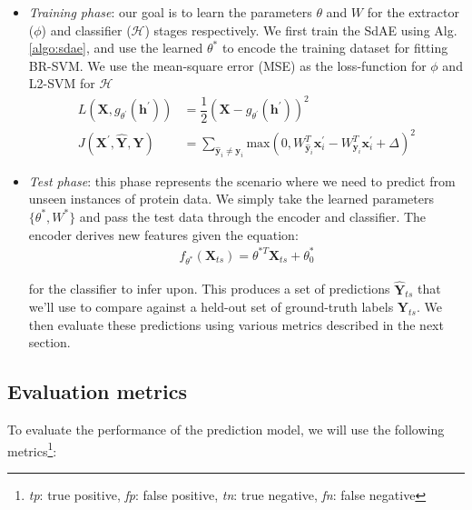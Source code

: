 \begin{itemize}
  \item \textit{Training phase}: our goal is to learn the parameters $\theta$
  and $W$ for the extractor ($\phi$) and classifier ($\mathcal{H}$) stages
  respectively. We first train the SdAE using Alg. \ref{algo:sdae}, and use
  the learned $\theta^{\ast}$ to encode the training dataset for fitting
  BR-SVM. We use the mean-square error (MSE) as the loss-function for $\phi$ and
  L2-SVM for $\mathcal{H}$
  \begin{align}
    \label{eqn:loss_fe_sdae}
    L(\mathbf{X},g_{\theta^{\prime}}(\mathbf{h}^{\prime})) &=
      \dfrac{1}{2}(\mathbf{X} - g_{\theta^{\prime}}(\mathbf{h}^{\prime}))^{2}\\
    \label{eqn:loss_clf_sdae}
    J(\mathbf{X}^{\prime}, \widehat{\mathbf{Y}}, \mathbf{Y}) &= \sum_{\widehat{\mathbf{y}}_i \neq \mathbf{y}_{i}} \text{max}(0, W^{T}_{\widehat{\mathbf{y}}_{i}} \mathbf{x}_{i}^{\prime} - W^{T}_{\mathbf{y}_i}\mathbf{x}^{\prime}_i + \Delta)^2
  \end{align}
  \item \textit{Test phase}: this phase represents the scenario where we need
  to predict from unseen instances of protein data. We simply take the
  learned parameters $\{\theta^{\ast}, W^{\ast}\}$ and pass the test data
  through the encoder and classifier. The encoder derives new features given the
  equation: 
  \begin{align}
    \label{eqn:encoder_mc_sdae}
    f_{\theta^{\ast}}(\mathbf{X}_{ts}) = \theta^{\ast T} \mathbf{X}_{ts} + \theta_{0}^{\ast}
  \end{align}
  
  \noindent for the classifier to infer upon. This produces a set of
  predictions $\mathbf{\widehat{Y}}_{ts}$ that we'll use to compare against a
  held-out set of ground-truth labels $\mathbf{Y}_{ts}$. We then evaluate
  these predictions using various metrics described in the next section.
\end{itemize}

\newpage
\subsection{Evaluation metrics}

To evaluate the performance of the prediction model, we will use the following
metrics\footnote[2]{\textit{tp}: true positive, \textit{fp}: false positive,
\textit{tn}: true negative, \textit{fn}: false negative}:


